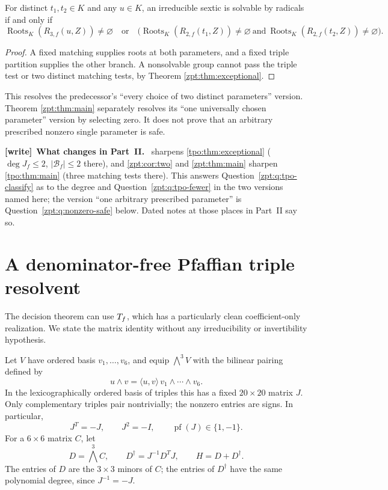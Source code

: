 \documentclass[11pt,letterpaper]{article}
\numberwithin{equation}{section}
\theoremstyle{definition}
\theoremstyle{remark}
\newcommand{\Rtwo}{R_{2,f}}
\newcommand{\Rthree}{R_{3,f}}
\DeclareMathOperator{\pf}{pf}
\DeclareMathOperator{\Roots}{Roots}
\newcommand{\roots}[1]{\Roots_K(#1)}
\newenvironment{writenote}[1][]{\par\smallskip\begingroup\small
 \noindent\textbf{[write]}\if\relax\detokenize{#1}\relax\else~\textbf{#1.}\fi\ }%
 {\par\endgroup\smallskip}
\begin{document}
\begin{corollary}
\label{zpt:cor:two}
For distinct $t_1,t_2\in K$ and any $u\in K$, an irreducible sextic is
solvable by radicals if and only if
\[
 \roots{\Rthree(u,Z)}\ne\varnothing
 \quad\text{or}\quad
 \bigl(\roots{\Rtwo(t_1,Z)}\ne\varnothing
       \ \text{and}\ \roots{\Rtwo(t_2,Z)}\ne\varnothing\bigr).
\]
\end{corollary}
\begin{proof}
A fixed matching supplies roots at both parameters, and a fixed triple
partition supplies the other branch. A nonsolvable group cannot pass the
triple test or two distinct matching tests, by Theorem
\ref{zpt:thm:exceptional}.
\end{proof}
This resolves the predecessor's ``every choice of two distinct parameters''
version. Theorem \ref{zpt:thm:main} separately resolves its ``one universally
chosen parameter'' version by selecting zero. It does not prove that an
arbitrary prescribed nonzero single parameter is safe.

\begin{writenote}[What changes in Part~II]
 sharpens \cref{tpo:thm:exceptional}
($\deg J_f\le2$, $|\mathcal B_f|\le2$ there), and \cref{zpt:cor:two} and
\cref{zpt:thm:main} sharpen \cref{tpo:thm:main} (three matching tests
there). This answers Question~\ref{zpt:q:tpo-classify} as to the degree and
Question~\ref{zpt:q:tpo-fewer} in the two versions named here; the version
``one arbitrary prescribed parameter'' is Question~\ref{zpt:q:nonzero-safe}
below. Dated notes at those places in Part~II say so.
\end{writenote}

\section{A denominator-free Pfaffian triple resolvent}
\label{zpt:sec:pfaffian}
The decision theorem can use $T_f$, which has a particularly clean
coefficient-only realization. We state the matrix identity without any
irreducibility or invertibility hypothesis.

Let $V$ have ordered basis $v_1,\ldots,v_6$, and equip $\bigwedge^3V$ with
the bilinear pairing defined by
\[
 u\wedge v=\langle u,v\rangle\,
 v_1\wedge\cdots\wedge v_6.
\]
In the lexicographically ordered basis of triples this has a fixed
$20\times20$ matrix $J$. Only complementary triples pair nontrivially;
the nonzero entries are signs. In particular,
\begin{equation}
 J^T=-J,\qquad J^2=-I,\qquad \pf(J)\in\{1,-1\}.\label{zpt:eq:Jmatrix}
\end{equation}
For a $6\times6$ matrix $C$, let
\begin{equation}
 D=\bigwedge^3 C,\qquad D^\dagger=J^{-1}D^TJ,
 \qquad H=D+D^\dagger.\label{zpt:eq:D-H}
\end{equation}
The entries of $D$ are the $3\times3$ minors of $C$; the entries of
$D^\dagger$ have the same polynomial degree, since $J^{-1}=-J$.
\end{document}
